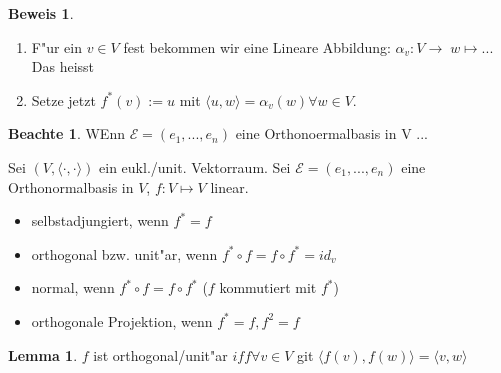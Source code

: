\documentclass[oneside,fontsize=11pt,paper=a4,BCOR=0mm,DIV=12,automark,headsepline]{scrbook}
\theoremstyle{remark}
\theoremstyle{definition}
\newtheorem*{notte}{Beachte}
\newtheorem{lemma}{Lemma}[section]
\theoremstyle{definition}
\newtheorem*{prof}{Beweis}
\theoremstyle{remark}
\begin{document}
\begin{prof}
  \begin{enumerate}
  \item F"ur ein $v\in V$ fest bekommen wir eine Lineare Abbildung: $\alpha_v:
    V\rightarrow \; w \mapsto $... Das heisst
  \item Setze jetzt $f^*(v):=u$ mit $\langle {u, w} \rangle = \alpha_v(w)\forall
    w\in V$. 
  \end{enumerate}
\end{prof}

\begin{notte}
  WEnn $\mathcal{E}=(e_1, ..., e_n)$ eine Orthonoermalbasis in V ...
\end{notte}

\begin{definition}
  Sei $(V, \langle {\cdot, \cdot} \rangle)$ ein eukl./unit. Vektorraum. Sei
  $\mathcal{E}=(e_1,...,e_n)$ eine Orthonormalbasis in $V$, $f: V\mapsto V $
  linear. 
  \begin{itemize}
  \item selbstadjungiert, wenn $f^*=f$
  \item orthogonal bzw. unit"ar, wenn $f^*\circ f = f\circ f^*=id_v$
  \item normal, wenn $f^*\circ f = f\circ f^* $ ($f$ kommutiert mit $f^*$)
  \item orthogonale Projektion, wenn $f^*=f, f^2=f$
  \end{itemize}
\end{definition}


\begin{lemma}
  $f$ ist orthogonal/unit"ar $iff \forall v\in V$ git $\langle {f(v), f(w)}
  \rangle = \langle {v,w} \rangle$
\end{lemma}
\end{document}
